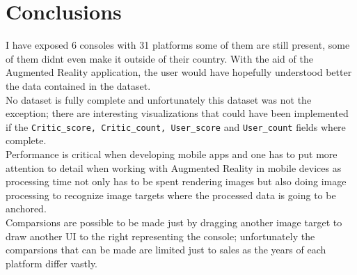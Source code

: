 \section{Conclusions}
I have exposed 6 consoles with 31 platforms some of them are still present,
some of them didnt even make it outside of their country. With the
aid of the Augmented Reality application, the user would have hopefully
understood better the data contained in the dataset.\\

No dataset is fully complete and unfortunately this dataset was not the
exception; there are interesting visualizations that could have been
implemented if the \texttt{Critic\_score, Critic\_count, User\_score} and
\texttt{User\_count} fields where complete.\\

Performance is critical when developing mobile apps and one has to put more
attention to detail when working with Augmented Reality in mobile devices as
processing time not only has to be spent rendering images but also doing
image processing to recognize image targets where the processed data is going
to be anchored.\\

Comparsions are possible to be made just by dragging another image target to
draw another UI to the right representing the console; unfortunately the
comparsions that can be made are limited just to sales as the years of each
platform differ vastly.


